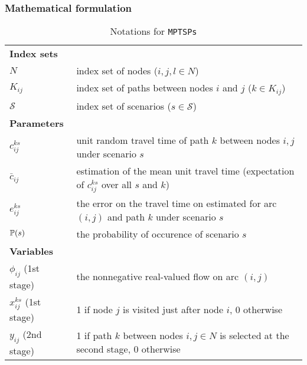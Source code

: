 \subsubsection{Mathematical formulation}
\begin{table}[H]
	\caption{Notations for \texttt{MPTSPs}}
	\label{notation}
	\resizebox{\textwidth}{!}
	{
		\begin{tabular}{ll}
			\toprule
			\textbf{Index sets} &  \\ 
			$N$ & \textrm{index set of nodes ($i,j,l\in N$)} \\ 
			$K_{ij}$ & \textrm{index set of paths between nodes $i$ and $j$ ($k\in K_{ij}$)} \\ 
			$\mathcal{S}$ & \textrm{index set of scenarios ($s\in \mathcal{S}$)}\\
			\textbf{Parameters} &   \\ 
			$c_{ij}^{ks}$ & \textrm{unit random travel time of path $k$ between nodes $i,j$ under scenario $s$} \\ 
			$\bar{c}_{ij}$ & \textrm{estimation of the mean unit travel time (expectation of $c_{ij}^{ks}$ over all $s$ and $k$)} \\ 
			$e_{ij}^{ks}$ & \textrm{the error on the travel time on estimated for arc $(i,j)$ and path $k$ under scenario $s$} \\ 
			$\operatorname*{\mathbb{P}}(s)$ & \textrm{the probability of occurence of scenario $s$} \\ 
			\textbf{Variables} &  \\ 
			$\phi_{ij}$ (1st stage) & \textrm{the nonnegative real-valued flow on arc $(i,j)$}\\
			$x_{ij}^{ks}$ (1st stage) & \textrm{1 if node $j$ is visited just after node $i$, 0 otherwise} \\ 
			$y_{ij}$ (2nd stage)& \textrm{1 if path $k$ between nodes $i,j\in N$ is selected at the second stage, 0 otherwise} \\ 

			\hline
		\end{tabular}
 	}
\end{table} 

